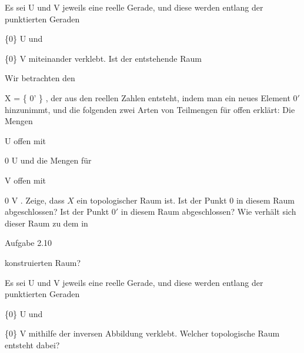 {}
{





Es sei
\mathkor {} {U} {und} {V} {}
jeweils eine reelle Gerade, und diese werden entlang der punktierten Geraden

\mavergleichskette
{\vergleichskette
{\R \setminus \{0\}
}
{ \subseteq }{ U
}
{  }{
}
{    }{
}
{   }{
}
}
{}{}{}
und

\mavergleichskette
{\vergleichskette
{\R \setminus \{0\}
}
{ \subseteq }{ V
}
{  }{
}
{    }{
}
{   }{
}
}
{}{}{}
miteinander verklebt. Ist der entstehende Raum





}
{} {}

{}
{





Wir betrachten den

\mavergleichskettedisp
{\vergleichskette
{X
}
{ =} { \R \cup \{ 0' \}
}
{ } {
}
{ } {
}
{ } {
}
}
{}{}{,}
der aus den reellen Zahlen entsteht, indem man ein neues Element $0'$  hinzunimmt, und die folgenden zwei Arten von Teilmengen für offen erklärt: Die Mengen

\mavergleichskette
{\vergleichskette
{U
}
{ \subseteq }{ \R
}
{  }{
}
{    }{
}
{   }{
}
}
{}{}{}
offen mit

\mavergleichskette
{\vergleichskette
{ 0
}
{ \notin }{U
}
{  }{
}
{    }{
}
{   }{
}
}
{}{}{}
und die Mengen
 für

\mavergleichskette
{\vergleichskette
{V
}
{ \subseteq }{\R
}
{  }{
}
{    }{
}
{   }{
}
}
{}{}{}
offen mit

\mavergleichskette
{\vergleichskette
{ 0
}
{ \in }{ V
}
{  }{
}
{    }{
}
{   }{
}
}
{}{}{.}
Zeige, dass $X$ ein topologischer Raum ist. Ist der Punkt $0$ in diesem Raum abgeschlossen? Ist der Punkt $0'$ in diesem Raum abgeschlossen? Wie verhält sich dieser Raum zu dem in

Aufgabe 2.10

konstruierten Raum?





}
{} {}

{}
{





Es sei
\mathkor {} {U} {und} {V} {}
jeweils eine reelle Gerade, und diese werden entlang der punktierten Geraden

\mavergleichskette
{\vergleichskette
{\R \setminus \{0\}
}
{ \subseteq }{ U
}
{  }{
}
{    }{
}
{   }{
}
}
{}{}{}
und

\mavergleichskette
{\vergleichskette
{\R \setminus \{0\}
}
{ \subseteq }{ V
}
{  }{
}
{    }{
}
{   }{
}
}
{}{}{}
mithilfe der inversen Abbildung
 verklebt. Welcher topologische Raum entsteht dabei?





}
{} {}

